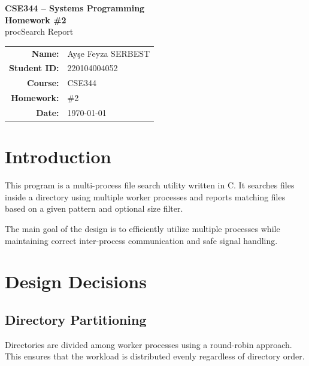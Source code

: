 \documentclass[12pt,a4paper]{article}
\begin{document}
\begin{titlepage}
    \centering

    \vspace*{3cm}

    {\Large \textbf{CSE344 -- Systems Programming}}\\[1.5cm]

    {\LARGE \textbf{Homework \#2}}\\[0.5cm]
    {\large procSearch Report}\\[2cm]

    \begin{tabular}{rl}
        \textbf{Name:} & Ayşe Feyza SERBEST \\
        \textbf{Student ID:} & 220104004052 \\
        \textbf{Course:} & CSE344 \\
        \textbf{Homework:} & \#2 \\
        \textbf{Date:} & \today \\
    \end{tabular}

    \vfill
\end{titlepage}

\tableofcontents
\newpage

\section{Introduction}

This program is a multi-process file search utility written in C. 
It searches files inside a directory using multiple worker processes 
and reports matching files based on a given pattern and optional size filter.

The main goal of the design is to efficiently utilize multiple processes 
while maintaining correct inter-process communication and safe signal handling.

\section{Design Decisions}

\subsection{Directory Partitioning}

Directories are divided among worker processes using a round-robin approach. 
This ensures that the workload is distributed evenly regardless of directory order.
\end{document}
